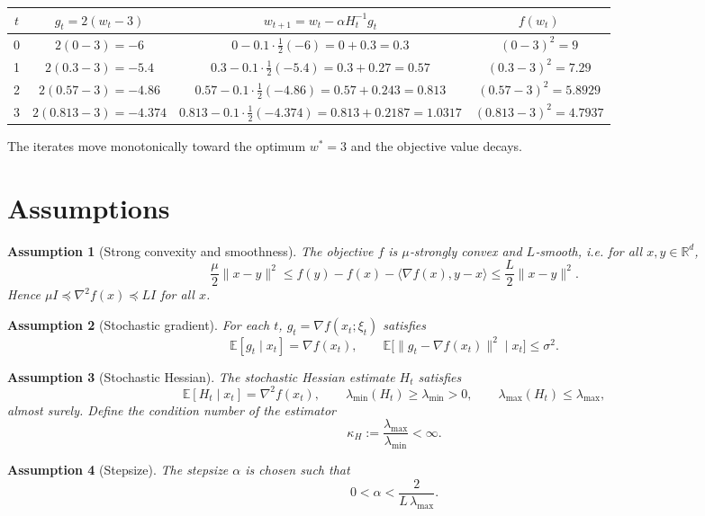 \documentclass[11pt]{article}
\newtheorem{assumption}{Assumption}
\newcommand{\E}{\mathbb{E}}
\newcommand{\R}{\mathbb{R}}
\begin{document}
\begin{center}
\begin{tabular}{c|c|c|c}
$t$ & $g_{t}=2(w_{t}-3)$ & $w_{t+1}=w_{t}-\alpha H_{t}^{-1}g_{t}$ & $f(w_{t})$\\\midrule
0 & $2(0-3)=-6$ & $0-0.1\cdot\frac{1}{2}(-6)=0+0.3=0.3$ & $(0-3)^{2}=9$\\
1 & $2(0.3-3)=-5.4$ & $0.3-0.1\cdot\frac{1}{2}(-5.4)=0.3+0.27=0.57$ & $(0.3-3)^{2}=7.29$\\
2 & $2(0.57-3)=-4.86$ & $0.57-0.1\cdot\frac{1}{2}(-4.86)=0.57+0.243=0.813$ & $(0.57-3)^{2}=5.8929$\\
3 & $2(0.813-3)=-4.374$ & $0.813-0.1\cdot\frac{1}{2}(-4.374)=0.813+0.2187=1.0317$ & $(0.813-3)^{2}=4.7937$
\end{tabular}
\end{center}
The iterates move monotonically toward the optimum $w^{*}=3$ and the objective value decays.

\newpage

\section*{Assumptions}
\begin{assumption}[Strong convexity and smoothness]\label{ass:sc}
The objective $f$ is $\mu$‑strongly convex and $L$‑smooth, i.e. for all $x,y\in\R^{d}$,
\[
\frac{\mu}{2}\|x-y\|^{2}\le f(y)-f(x)-\langle\nabla f(x),y-x\rangle\le
\frac{L}{2}\|x-y\|^{2}.
\]
Hence $\mu I\preceq \nabla^{2}f(x)\preceq L I$ for all $x$.
\end{assumption}

\begin{assumption}[Stochastic gradient]\label{ass:grad}
For each $t$, $g_{t}=\nabla f(x_{t};\xi_{t})$ satisfies
\[
\E[g_{t}\mid x_{t}]=\nabla f(x_{t}),\qquad
\E\big[\|g_{t}-\nabla f(x_{t})\|^{2}\mid x_{t}\big]\le\sigma^{2}.
\]
\end{assumption}

\begin{assumption}[Stochastic Hessian]\label{ass:hess}
The stochastic Hessian estimate $H_{t}$ satisfies
\[
\E[H_{t}\mid x_{t}]=\nabla^{2}f(x_{t}),\qquad
\lambda_{\min}(H_{t})\ge \lambda_{\min}>0,\qquad
\lambda_{\max}(H_{t})\le \lambda_{\max},
\]
almost surely. Define the condition number of the estimator
\[
\kappa_{H}:=\frac{\lambda_{\max}}{\lambda_{\min}}<\infty .
\]
\end{assumption}

\begin{assumption}[Stepsize]\label{ass:step}
The stepsize $\alpha$ is chosen such that
\[
0<\alpha<\frac{2}{L\,\lambda_{\max}}.
\]
\end{assumption}
\end{document}
